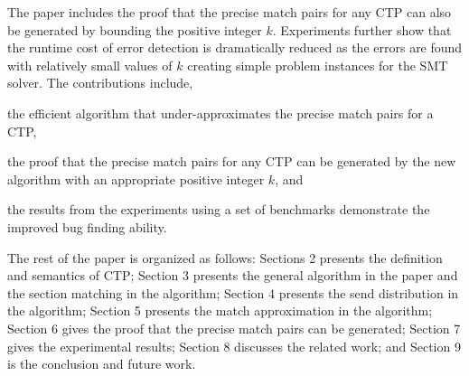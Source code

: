 The paper includes the proof that the precise match pairs for any CTP can also be generated by bounding the positive integer $k$. 
Experiments further show that the runtime cost of error detection is dramatically reduced as the errors are found with relatively small values of $k$ creating simple problem instances for the SMT solver. 
The contributions include,
\begin{compactitem}
\item the efficient algorithm that under-approximates the precise match pairs for a CTP, 
\item the proof that the precise match pairs for any CTP can be generated by the new algorithm with an appropriate positive integer $k$, and
\item the results from the experiments using a set of benchmarks demonstrate the improved bug finding ability.
\end{compactitem}

The rest of the paper is organized as follows: 
Sections 2 presents the definition and semantics of CTP; Section 3 presents the general algorithm in the paper and the section matching in the algorithm; Section 4 presents the send distribution in the algorithm; Section 5 presents the match approximation in the algorithm; Section 6 gives the proof that the precise match pairs can be generated; Section 7 gives the experimental results; Section 8 discusses the related work; and Section 9 is the conclusion and future work.
